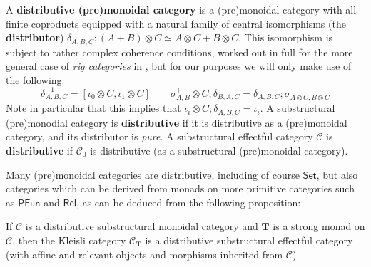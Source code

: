 \documentclass[acmsmall,screen,review]{acmart}
\newcommand{\mc}[1]{\ensuremath{\mathcal{#1}}}
\newcommand{\mb}[1]{\ensuremath{\mathbf{#1}}}
\newcommand{\ms}[1]{\ensuremath{\mathsf{#1}}}
\begin{document}
\begin{definition} 
  A \textbf{distributive (pre)monoidal category} is a (pre)monoidal category
  with all finite coproducts equipped with a natural family of central
  isomorphisms (the \textbf{distributor}) \(\delta_{A, B, C}: (A + B) \otimes C
  \simeq A \otimes C + B \otimes C\). This isomorphism is subject to rather
  complex coherence conditions, worked out in full for the more general case of
  \textit{rig categories} in \cite{laplaza-distributivity}, but for our purposes
  we will only make use of the following:
  \begin{equation*}
    \delta_{A, B, C}^{-1} = [\iota_0 \otimes C, \iota_1 \otimes C] 
    \qquad
    \sigma^+_{A, B} \otimes C;\delta_{B, A, C} = \delta_{A, B, C};\sigma^+_{A \otimes C, B \otimes C}
  \end{equation*}
  Note in particular that this implies that \(\iota_i \otimes C;\delta_{A, B, C}
  = \iota_i\). A substructural (pre)monodial category is \textbf{distributive}
  if it is distributive as a (pre)monoidal category, and its distributor is
  \textit{pure}. A substructural effectful category \(\mc{C}\) is
  \textbf{distributive} if \(\mc{C}_0\) is distributive (as a substructural
  (pre)monoidal category).
\end{definition}
Many (pre)monoidal categories are distributive, including of course
\(\ms{Set}\), but also categories which can be derived from monads on more
primitive categories such as \(\ms{PFun}\) and \(\ms{Rel}\), as can be deduced
from the following proposition:
\begin{proposition}
  If \(\mc{C}\) is a distributive substructural monoidal category and \(\mb{T}\)
  is a strong monad on \(\mc{C}\), then the Kleisli category \(\mc{C}_{\mb{T}}\)
  is a distributive substructural effectful category (with affine and relevant
  objects and morphisms inherited from \(\mc{C}\))
\end{proposition}
\end{document}
